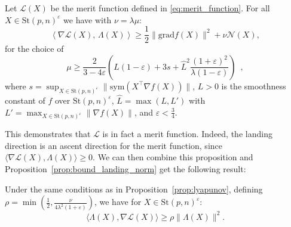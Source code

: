 \documentclass[twoside,11pt]{article}
\newcommand{\grad}{{\mathrm{grad}}}
\newcommand{\stiefel}{{\mathrm{St}(p, n)}}
\newcommand{\sym}{{\mathrm{sym}}}
\newcommand{\cN}{\mathcal{N}} %
\newcommand{\cL}{\mathcal{L}} %
\newcommand{\inner}[2]{\left\langle#1,\,#2\right\rangle} %
\newcommand{\Lc}{L} %
\newcommand{\finalrevision}[1]{{#1}}
\begin{document}
%
%
%
%
%

%
%
%
%
%

%
%
%
%
%

%
%
%
%


%
%
%
%
%
%

%
%
%
%
%
%
%

%
%
%
%
%
%
%

%
%
%
%
%
%
%
%
%
%
%
  
%
%
%
%
%

%
%
%
%
%
  
%
%
%
%
%

%
%
%
%


%
%
%
%
%
%

%
%
%
%
%
%
%
%
%
%

%

\begin{proposition} \label{prop:lyapunov}
    Let $\cL(X)$ be the merit function defined in \eqref{eq:merit_function}. For all $X \in \stiefel^\varepsilon$ we have with $\nu = \lambda \mu$:%
    \begin{equation}
        \inner{\nabla\cL(X)}{\Lambda(X)} \geq \frac12 \| \grad f(X)\|^2 + \nu \cN(X),
    \end{equation}
    for the choice of 
    \begin{equation}
        \mu \geq \frac{2}{3-4\varepsilon}\left( \Lc(1-\varepsilon) + 3s + \finalrevision{\hat{L}^2 \frac{(1+\varepsilon)^2}{\lambda(1-\varepsilon)}}  \right)\enspace,
    \end{equation}
    where $s = \sup_{X\in\stiefel^\varepsilon} \| \sym(X^\top \nabla f(X)) \|$, $\Lc>0$ is the smoothness constant of $f$ over $\stiefel^\varepsilon$, $\hat{L} = \max(L, L')$ with $L' = \max_{X\in\stiefel^\varepsilon}\|\nabla f(X)\|$,
    and $\varepsilon<\frac34$.
\end{proposition}
%
%
This demonstrates that $\mathcal{L}$ is in fact a merit function.
%
Indeed, the landing direction is an ascent direction for the merit function, since $\langle \nabla \mathcal{L}(X), \Lambda(X)\rangle \geq 0$.
We can then combine this proposition and Proposition~\ref{prop:bound_landing_norm} 
%
get the following result:
%
\begin{proposition}
    \label{prop:bound_scalar_with_norm}
    Under the same conditions as in Proposition~\ref{prop:lyapunov}, defining $\rho = \min(\frac12, \frac{\nu}{4\lambda^2(1+\varepsilon)})$, we have for $X\in\stiefel^\varepsilon$:
    $$
    \langle \Lambda(X), \nabla \mathcal{L}(X)\rangle \geq \rho \|\Lambda(X)\|^2.
    $$
\end{proposition}
\end{document}

